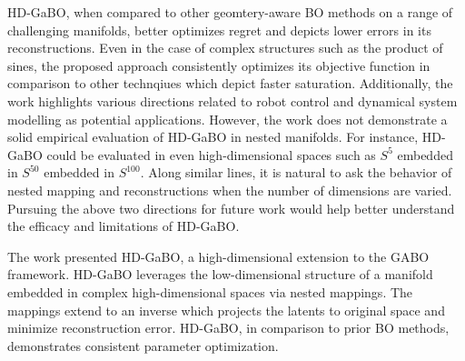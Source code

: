 \documentclass[12pt,letterpaper]{article}
\begin{document}
HD-GaBO, when compared to other geomtery-aware BO methods on a range of challenging manifolds, better optimizes regret and depicts lower errors in its reconstructions. Even in the case of complex structures such as the product of sines, the proposed approach consistently optimizes its objective function in comparison to other technqiues which depict faster saturation. Additionally, the work highlights various directions related to robot control and dynamical system modelling as potential applications. However, the work does not demonstrate a solid empirical evaluation of HD-GaBO in nested manifolds. For instance, HD-GaBO could be evaluated in even high-dimensional spaces such as $S^{5}$ embedded in $S^{50}$ embedded in $S^{100}$. Along similar lines, it is natural to ask the behavior of nested mapping and reconstructions when the number of dimensions are varied. Pursuing the above two directions for future work would help better understand the efficacy and limitations of HD-GaBO.

The work presented HD-GaBO, a high-dimensional extension to the GABO framework. HD-GaBO leverages the low-dimensional structure of a manifold embedded in complex high-dimensional spaces via nested mappings. The mappings extend to an inverse which projects the latents to original space and minimize reconstruction error. HD-GaBO, in comparison to prior BO methods, demonstrates consistent parameter optimization.
\end{document}
